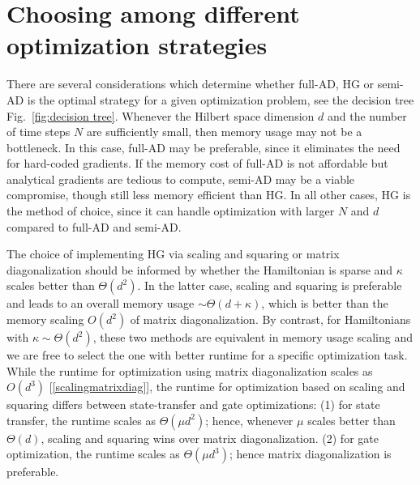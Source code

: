 \section{Choosing among different optimization strategies }
\label{Decision tree}
There are several considerations which determine whether full-AD, HG or semi-AD is the optimal strategy for a given optimization problem, see the decision tree Fig.\ \ref{fig:decision tree}. Whenever the Hilbert space dimension $d$ and the number of time steps $N$ are sufficiently small, then memory usage may not be a bottleneck. In this case, full-AD may be preferable, since it eliminates the need for hard-coded gradients. If the memory cost of full-AD is not affordable but analytical gradients are tedious to compute, semi-AD may be a viable compromise, though still less memory efficient than HG. In all other cases, HG is the method of choice, since it can handle optimization with larger $N$ and $d$ compared to full-AD and semi-AD. 

The choice of implementing HG via scaling and squaring or matrix diagonalization should be informed by whether the Hamiltonian is sparse and $\kappa$ scales better than $\Theta(d^2)$. In the latter case, scaling and squaring is preferable and leads to an overall memory usage $\sim \Theta(d+\kappa)$, which is better than the memory scaling $O(d^2)$ of matrix diagonalization. By contrast, for Hamiltonians with $\kappa\sim \Theta(d^2)$, these two methods are equivalent in memory usage scaling and we are free to select the one with better runtime for a specific optimization task. While the runtime for optimization using matrix diagonalization scales as $O(d^3)$ [\ref{scalingmatrixdiag}], the runtime for optimization based on scaling and squaring differs between state-transfer and gate optimizations: (1) for state transfer, the runtime scales as $\Theta(\mu d^2)$; hence, whenever $\mu$ scales better than $\Theta(d)$, scaling and squaring wins over matrix diagonalization. (2) for gate optimization, the runtime scales as $\Theta(\mu d^3)$; hence matrix diagonalization is preferable. 


